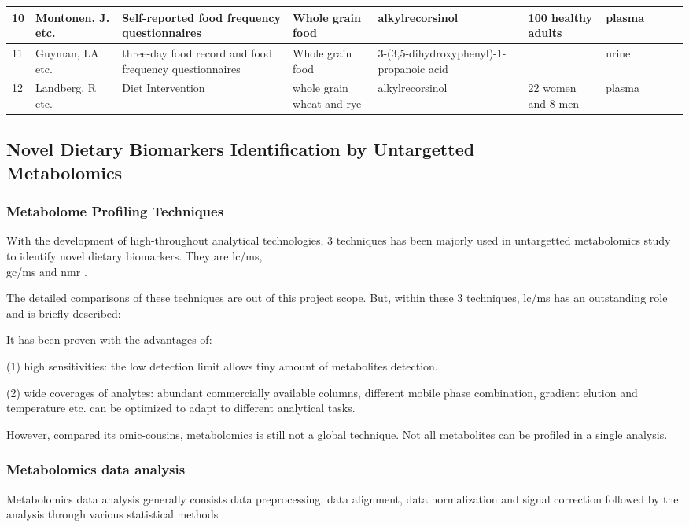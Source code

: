 \begin{center}
{\begin{small}
\begin{tabular}{|m{0.5cm}|m{1.8cm}|m{2.5cm}|m{2.5cm}|m{2.5cm}|m{2cm}|m{2cm}|m{2cm}|m{0.8cm}|m{0.3cm}}
10&	Montonen, J. etc.&	Self-reported food frequency questionnaires&	Whole grain food&	alkylrecorsinol&	100 healthy adults&	plasma	&\cite{ISI:000279623300007}\\ \hline
11&	Guyman, LA etc.&	three-day food record and food frequency questionnaires&	Whole grain food&	3-(3,5-dihydroxyphenyl)-1-propanoic acid& &	urine&	\cite{ISI:000259554500019}\\ \hline
12&	Landberg, R etc.&	Diet Intervention&	whole grain wheat and rye&	alkylrecorsinol&	22 women and 8 men&	plasma	&\cite{ISI:000255012000007}\\ \hline
\end{tabular}
\end{small}
}
\end{center}

\subsection{Novel Dietary Biomarkers Identification by Untargetted \\ Metabolomics}
\subsubsection{Metabolome Profiling Techniques}
With the development of high-throughout analytical technologies, 3 techniques has been majorly used in untargetted metabolomics study to identify novel dietary biomarkers. They are \acrfull{lc/ms}, \\\acrfull{gc/ms} and \acrfull{nmr} \cite{Scalbert2014}. 

The detailed comparisons of these techniques are out of this project scope. But, within these 3 techniques, \acrshort{lc/ms} has an outstanding role and is briefly described:

It has been proven with the advantages of:

(1) high sensitivities: the low detection limit allows tiny amount of metabolites detection.

(2) wide coverages of analytes: abundant commercially available columns, different mobile phase combination, gradient elution and temperature etc. can be optimized to adapt to different analytical tasks.

However, compared its omic-cousins, metabolomics is still not a global technique. Not all metabolites can be profiled in a single analysis.

\subsubsection{Metabolomics data analysis}
Metabolomics data analysis generally consists data preprocessing, data alignment, data normalization and signal correction followed by the analysis through various statistical methods \cite{Scalbert2014}

